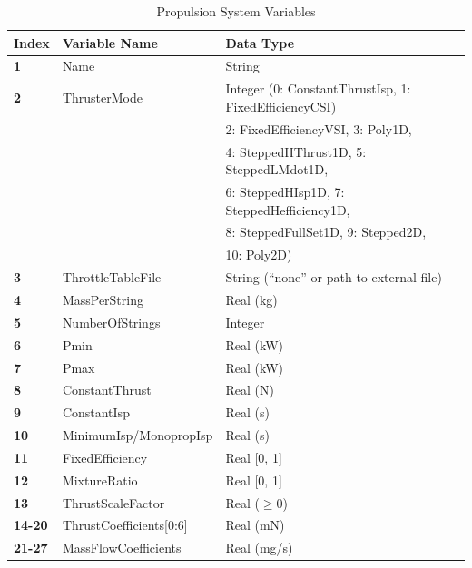 \begin{table}[H]
    \centering
    \begin{tabular}{lll}
    \hline
    \textbf{Index} & \textbf{Variable Name} & \textbf{Data Type} \\
    \hline
    \textbf{1} & Name & String \\
    \textbf{2} & ThrusterMode & Integer (0: ConstantThrustIsp, 1: FixedEfficiencyCSI) \\ & & \hspace{41pt}2: FixedEfficiencyVSI, 3: Poly1D, \\ & & \hspace{41pt}4: SteppedHThrust1D, 5: SteppedLMdot1D, \\ & & \hspace{41pt}6: SteppedHIsp1D, 7: SteppedHefficiency1D, \\ & & \hspace{41pt}8: SteppedFullSet1D, 9: Stepped2D, \\ & & \hspace{41pt}10: Poly2D) \\
    \textbf{3} & ThrottleTableFile & String (``none'' or path to external file) \\
    \textbf{4} & MassPerString & Real (kg) \\
    \textbf{5} & NumberOfStrings & Integer \\
    \textbf{6} & Pmin & Real (kW) \\
    \textbf{7} & Pmax & Real (kW) \\
    \textbf{8} & ConstantThrust & Real (N) \\
    \textbf{9} & ConstantIsp & Real (s) \\
    \textbf{10} & MinimumIsp/MonopropIsp & Real (s) \\
    \textbf{11} & FixedEfficiency & Real [0, 1] \\
    \textbf{12} & MixtureRatio & Real [0, 1] \\
    \textbf{13} & ThrustScaleFactor & Real ($\geq$0) \\
    \textbf{14-20} & ThrustCoefficients[0:6] & Real (mN) \\
    \textbf{21-27} & MassFlowCoefficients & Real (mg/s) \\
    \end{tabular}
    \caption{Propulsion System Variables}
    \label{tab:spacecraft_stage_proplib_block}
\end{table}

